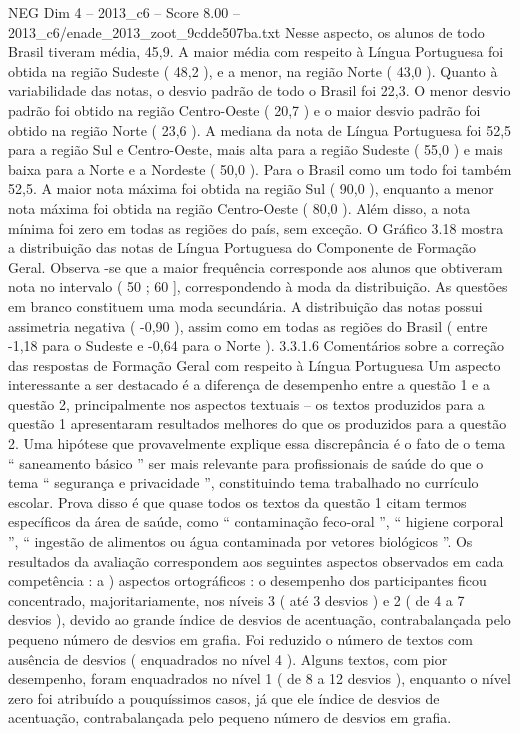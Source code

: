 \begin{textsample}{NEG Dim 4 – 2013\_c6 – Score 8.00 – 2013\_c6/enade\_2013\_zoot\_9cdde507ba.txt}
Nesse aspecto, os alunos de todo Brasil tiveram média, 45,9.
A maior média com respeito à Língua Portuguesa foi obtida na região Sudeste ( 48,2 ), e a menor, na região Norte ( 43,0 ).
Quanto à variabilidade das notas, o desvio padrão de todo o Brasil foi 22,3.
O menor desvio padrão foi obtido na região Centro-Oeste ( 20,7 ) e o maior desvio padrão foi obtido na região Norte ( 23,6 ).
A mediana da nota de Língua Portuguesa foi 52,5 para a região Sul e Centro-Oeste, mais alta para a região Sudeste ( 55,0 ) e mais baixa para a Norte e a Nordeste ( 50,0 ).
Para o Brasil como um todo foi também 52,5.
A maior nota máxima foi obtida na região Sul ( 90,0 ), enquanto a menor nota máxima foi obtida na região Centro-Oeste ( 80,0 ).
Além disso, a nota mínima foi zero em todas as regiões do país, sem exceção.
O Gráfico 3.18 mostra a distribuição das notas de Língua Portuguesa do Componente de Formação Geral.
Observa -se que a maior frequência corresponde aos alunos que obtiveram nota no intervalo ( 50 ; 60 ], correspondendo à moda da distribuição.
As questões em branco constituem uma moda secundária.
A distribuição das notas possui assimetria negativa ( -0,90 ), assim como em todas as regiões do Brasil ( entre -1,18 para o Sudeste e -0,64 para o Norte ). 3.3.1.6 Comentários sobre a correção das respostas de Formação Geral com respeito à Língua Portuguesa Um aspecto interessante a ser destacado é a diferença de desempenho entre a questão 1 e a questão 2, principalmente nos aspectos textuais – os textos produzidos para a questão 1 apresentaram resultados melhores do que os produzidos para a questão 2.
Uma hipótese que provavelmente explique essa discrepância é o fato de o tema “ saneamento básico ” ser mais relevante para profissionais de saúde do que o tema “ segurança e privacidade ”, constituindo tema trabalhado no currículo escolar.
Prova disso é que quase todos os textos da questão 1 citam termos específicos da área de saúde, como “ contaminação feco-oral ”, “ higiene corporal ”, “ ingestão de alimentos ou água contaminada por vetores biológicos ”.
Os resultados da avaliação correspondem aos seguintes aspectos observados em cada competência : a ) aspectos ortográficos : o desempenho dos participantes ficou concentrado, majoritariamente, nos níveis 3 ( até 3 desvios ) e 2 ( de 4 a 7 desvios ), devido ao grande índice de desvios de acentuação, contrabalançada pelo pequeno número de desvios em grafia.
Foi reduzido o número de textos com ausência de desvios ( enquadrados no nível 4 ).
Alguns textos, com pior desempenho, foram enquadrados no nível 1 ( de 8 a 12 desvios ), enquanto o nível zero foi atribuído a pouquíssimos casos, já que ele índice de desvios de acentuação, contrabalançada pelo pequeno número de desvios em grafia.

\end{textsample}
